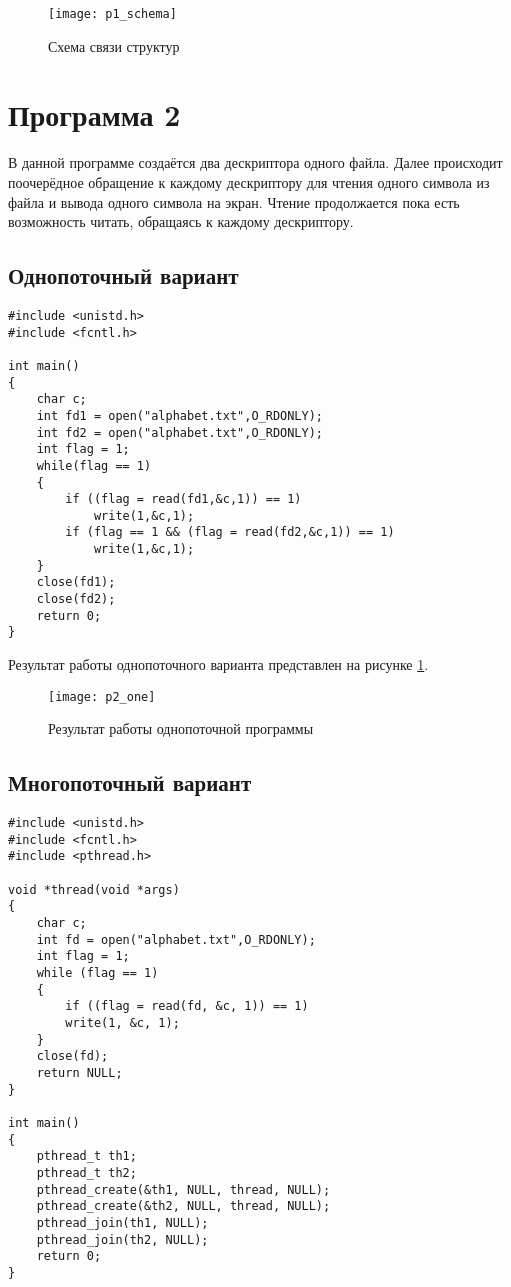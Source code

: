 \begin{figure}[ht!]
	\centering
	\texttt{[image: p1\_schema]}
	\caption{Схема связи структур}
\end{figure}


\section*{Программа 2}

В данной программе создаётся два дескриптора одного файла.
Далее происходит поочерёдное обращение к каждому дескриптору для чтения одного символа из файла и вывода одного символа на экран. Чтение продолжается пока есть возможность читать, обращаясь к каждому дескриптору.

\subsection*{Однопоточный вариант}

\begin{lstlisting}[caption=Однопоточный вариант]
#include <unistd.h>
#include <fcntl.h>

int main()
{
	char c;    
	int fd1 = open("alphabet.txt",O_RDONLY);
	int fd2 = open("alphabet.txt",O_RDONLY);
	int flag = 1;
	while(flag == 1)
	{
		if ((flag = read(fd1,&c,1)) == 1)
			write(1,&c,1);
		if (flag == 1 && (flag = read(fd2,&c,1)) == 1)
			write(1,&c,1);
	}
	close(fd1);
	close(fd2);
	return 0;
}
\end{lstlisting}

Результат работы однопоточного варианта представлен на рисунке \ref{p2_one}.

\begin{figure}[ht!]
	\centering
	\texttt{[image: p2\_one]}
	\caption{Результат работы однопоточной программы}
	\label{p2_one}
\end{figure}

\subsection*{Многопоточный вариант}

\begin{lstlisting}[caption=Многопоточный вариант]
#include <unistd.h>
#include <fcntl.h>
#include <pthread.h>

void *thread(void *args)
{
	char c;
	int fd = open("alphabet.txt",O_RDONLY);
	int flag = 1;
	while (flag == 1)
	{
		if ((flag = read(fd, &c, 1)) == 1)
		write(1, &c, 1);
	}
	close(fd);
	return NULL;
}

int main()
{
	pthread_t th1;
	pthread_t th2;
	pthread_create(&th1, NULL, thread, NULL);
	pthread_create(&th2, NULL, thread, NULL);
	pthread_join(th1, NULL);
	pthread_join(th2, NULL);
	return 0;
}
\end{lstlisting}

